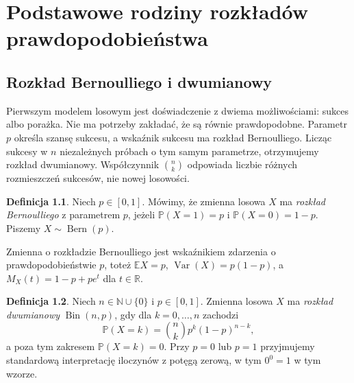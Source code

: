 \documentclass[11pt,a4paper,oneside]{report}
\numberwithin{equation}{chapter}
\theoremstyle{plain}
\theoremstyle{definition}
\newtheorem{definicja}{Definicja}[chapter]
\theoremstyle{remark}
\newcommand{\R}{\mathbb{R}}
\newcommand{\N}{\mathbb{N}}
\newcommand{\Prob}{\mathbb{P}}
\newcommand{\E}{\mathbb{E}}
\newcommand{\Var}{\operatorname{Var}}
\newcommand{\Bin}{\operatorname{Bin}}
\begin{document}
\chapter{Podstawowe rodziny rozkładów prawdopodobieństwa}

\section{Rozkład Bernoulliego i dwumianowy}
Pierwszym modelem losowym jest doświadczenie z dwiema
możliwościami: sukces albo porażka. Nie ma potrzeby zakładać,
że są równie prawdopodobne. Parametr $p$ określa szansę sukcesu,
a wskaźnik sukcesu ma rozkład Bernoulliego. Licząc sukcesy
w $n$ niezależnych próbach o tym samym parametrze, otrzymujemy
rozkład dwumianowy. Współczynnik $\binom nk$ odpowiada
liczbie różnych rozmieszczeń sukcesów, nie nowej losowości.

\begin{definicja}
Niech $p\in[0,1]$. Mówimy, że zmienna losowa $X$ ma
\emph{rozkład Bernoulliego} z parametrem $p$, jeżeli
$\Prob(X=1)=p$ i $\Prob(X=0)=1-p$.
Piszemy $X\sim\operatorname{Bern}(p)$.
\end{definicja}

Zmienna o rozkładzie Bernoulliego jest wskaźnikiem zdarzenia
o prawdopodobieństwie $p$, toteż
$\E X=p$, $\Var(X)=p(1-p)$, a
$M_X(t)=1-p+pe^t$ dla $t\in\R$.

\begin{definicja}
Niech $n\in\N\cup\{0\}$ i $p\in[0,1]$.
Zmienna losowa $X$ ma \emph{rozkład dwumianowy} $\Bin(n,p)$,
gdy dla $k=0,\ldots,n$ zachodzi
\begin{equation}\label{eq:binomial}
\Prob(X=k)=\binom nk p^k(1-p)^{n-k},
\end{equation}
a poza tym zakresem $\Prob(X=k)=0$. Przy $p=0$ lub $p=1$
przyjmujemy standardową interpretację iloczynów z potęgą zerową,
w tym $0^0=1$ w tym wzorze.
\end{definicja}
\end{document}
